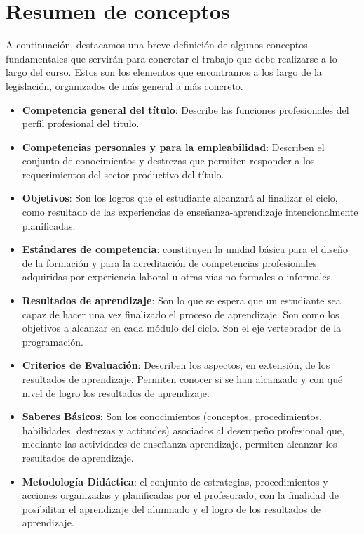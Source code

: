 
\section{Resumen de conceptos}

A continuación, destacamos una breve definición de algunos conceptos fundamentales que servirán para concretar el trabajo que debe realizarse a lo largo del curso. Estos son los elementos que encontramos a los largo de la legislación, organizados de más general a más concreto.

\begin{itemize}

\item {}
\textbf{Competencia general del título}: Describe las funciones profesionales del perfil profesional del título. 

\item {}
\textbf{Competencias personales y para la empleabilidad}: Describen el conjunto de conocimientos y destrezas que permiten responder a los requerimientos del sector productivo del título. 

\item {}
\textbf{Objetivos}: Son los logros que el estudiante alcanzará al finalizar el ciclo, como resultado de las experiencias de enseñanza-aprendizaje intencionalmente planificadas. 

\item {}
\textbf{Estándares de competencia}: constituyen la unidad básica para el diseño de la formación y para la acreditación de competencias profesionales adquiridas por experiencia laboral u otras vías no formales o informales.

\item {}
\textbf{Resultados de aprendizaje}: Son lo que se espera que un estudiante sea capaz de hacer una vez finalizado el proceso de aprendizaje. Son como los objetivos a alcanzar en cada módulo del ciclo. Son el eje vertebrador de la programación.

\item {}
\textbf{Criterios de Evaluación}: Describen los aspectos, en extensión, de los resultados de aprendizaje. Permiten conocer si se han alcanzado y con qué nivel de logro los resultados de aprendizaje. 

\item {}
\textbf{Saberes Básicos}: Son los conocimientos (conceptos, procedimientos, habilidades, destrezas y actitudes) asociados al desempeño profesional que, mediante las actividades de enseñanza-aprendizaje, permiten alcanzar los resultados de aprendizaje. 

\item {}
\textbf{Metodología Didáctica}: el conjunto de estrategias, procedimientos y acciones organizadas y planificadas por el profesorado, con la finalidad de posibilitar el aprendizaje del alumnado y el logro de los resultados de aprendizaje.
\end{itemize}

